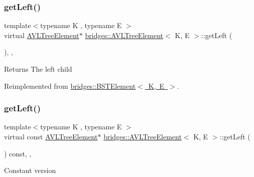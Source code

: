 \subsubsection{\texorpdfstring{get\+Left()}{getLeft()}\hspace{0.1cm}{\footnotesize\ttfamily [1/2]}}
{\footnotesize\ttfamily template$<$typename K , typename E $>$ \\
virtual \mbox{\hyperlink{classbridges_1_1_a_v_l_tree_element}{A\+V\+L\+Tree\+Element}}$\ast$ \mbox{\hyperlink{classbridges_1_1_a_v_l_tree_element}{bridges\+::\+A\+V\+L\+Tree\+Element}}$<$ K, E $>$\+::get\+Left (\begin{DoxyParamCaption}{ }\end{DoxyParamCaption})\hspace{0.3cm}{\ttfamily [inline]}, {\ttfamily [override]}, {\ttfamily [virtual]}}

\begin{DoxyReturn}{Returns}
The left child 
\end{DoxyReturn}


Reimplemented from \mbox{\hyperlink{classbridges_1_1_b_s_t_element_a4d8987373c75b51fca94e3c0b78b87a6}{bridges\+::\+B\+S\+T\+Element$<$ K, E $>$}}.

\mbox{\label{classbridges_1_1_a_v_l_tree_element_a61e075db5414b7bd6f52d657401acda3}} 
\subsubsection{\texorpdfstring{get\+Left()}{getLeft()}\hspace{0.1cm}{\footnotesize\ttfamily [2/2]}}
{\footnotesize\ttfamily template$<$typename K , typename E $>$ \\
virtual const \mbox{\hyperlink{classbridges_1_1_a_v_l_tree_element}{A\+V\+L\+Tree\+Element}}$\ast$ \mbox{\hyperlink{classbridges_1_1_a_v_l_tree_element}{bridges\+::\+A\+V\+L\+Tree\+Element}}$<$ K, E $>$\+::get\+Left (\begin{DoxyParamCaption}{ }\end{DoxyParamCaption}) const\hspace{0.3cm}{\ttfamily [inline]}, {\ttfamily [override]}, {\ttfamily [virtual]}}

Constant version

